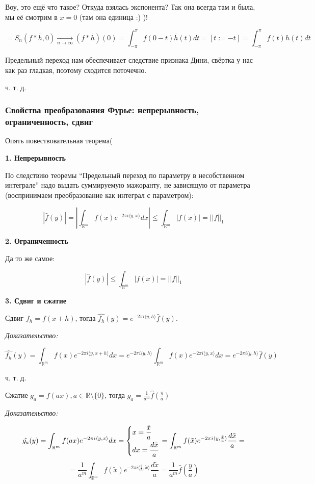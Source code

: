 \documentclass{article}
\def\goesto#1{\underset{#1}{\longrightarrow}}
\def\toinf#1{\goesto{#1 \rightarrow \infty}}
\def\ntoinf{\toinf{n}}
\def\sk#1#2{\langle #1, #2 \rangle}
\begin{document}
Воу, это ещё что такое? Откуда взялась экспонента? Так она всегда там и была, мы её смотрим в $x = 0$ (там она единица :) )!

\[ = S_n(f * \overline{h}, 0) \ntoinf (f * \overline{h})(0) = \int_{-\pi}^{\pi} f (0 - t)\overline{h}(t) dt = [t := -t] = \int_{-\pi}^{\pi} f(t)h(t) dt\]

Предельный переход нам обеспечивает следствие признака Дини, свёртка у нас как раз гладкая, поэтому сходится поточечно.  

ч. т. д. 

\subsubsection{Свойства преобразования Фурье: непрерывность, ограниченность, сдвиг}

Опять повествовательная теорема(

\textbf{1. Непрерывность}

По следствию теоремы ``Предельный переход по параметру в несобственном интеграле'' надо выдать суммируемую мажоранту, не зависящую от параметра (воспринимаем преобразование как интеграл с параметром):

\[|\hat{f}(y)| = \left| \int_{\mathbb{R}^m} f(x) e^{-2\pi i\sk{y}{x}}dx\right| \le \int_{\mathbb{R}^m} |f(x)| = ||f||_1\]

\textbf{2. Ограниченность}

Да то же самое:

\[|\hat{f}(y)| \le \int_{\mathbb{R}^m} |f(x)| = ||f||_1\]

\textbf{3. Сдвиг и сжатие}

Сдвиг $f_h = f(x + h)$, тогда $\hat{f_h}(y) = e^{-2 \pi i \sk{y}{h}} \hat{f}(y)$.

\textit{Доказательство:}

\[\hat{f_h}(y) = \int_{\mathbb{R}^m}f(x)e^{-2 \pi i \sk{y}{x + h}}dx = e^{-2\pi i \sk{y}{h}}\int_{\mathbb{R}^m}f(x)e^{-2 \pi i \sk{y}{x}}dx = e^{-2\pi i \sk{y}{h}} \hat{f}(y)\]

ч. т. д.

Сжатие $g_a = f(ax), a \in \mathbb{R} \setminus \{0\}$, тогда $\hat{g_a} = \frac{1}{a^m} \hat{f}\left(\frac{y}{a}\right)$

\textit{Доказательство:}

\[\hat{g_a}(y) = \int_{\mathbb{R}^m}f(ax)e^{-2 \pi i \sk{y}{x}}dx = \begin{dcases}
x = \frac{\tilde{x}}{a}\\
dx = \frac{d\tilde{x}}{a}
\end{dcases} = \int_{\mathbb{R}^m}f(\tilde{x})e^{-2 \pi i \sk{y}{\frac{\tilde{x}}{a}}}\frac{d\tilde{x}}{a} = \]
\[ = \frac{1}{a^m} \int_{\mathbb{R}^m}f(\tilde{x})e^{-2 \pi i \sk{\frac{y}{a}}{\tilde{x}}}\frac{d\tilde{x}}{a} = \frac{1}{a^m}\hat{f}\left(\frac{y}{a}\right)\]
\end{document}
